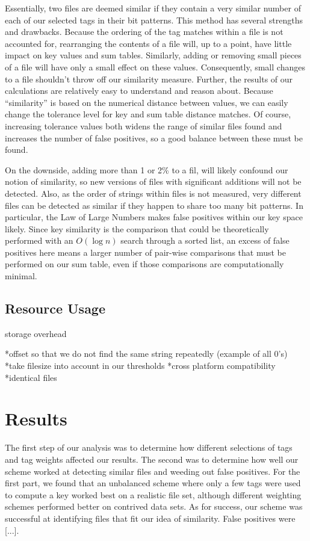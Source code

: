 \documentclass[10pt, twocolumn]{article}
\begin{document}
Essentially, two files are deemed similar if they contain a very similar number of each of our selected tags in their bit patterns.  This method has several strengths and drawbacks.  Because the ordering of the tag matches within a file is not accounted for, rearranging the contents of a file will, up to a point, have little impact on key values and sum tables.  Similarly, adding or removing small pieces of a file will have only a small effect on these values.  Consequently, small changes to a file shouldn't throw off our similarity measure.  Further, the results of our calculations are relatively easy to understand and reason about.  Because ``similarity'' is based on the numerical distance between values, we can easily change the tolerance level for key and sum table distance matches.  Of course, increasing tolerance values both widens the range of similar files found and increases the number of false positives, so a good balance between these must be found.

On the downside, adding more than 1 or 2\% to a fil, will likely confound our notion of similarity, so new versions of files with significant additions will not be detected.  Also, as the order of strings within files is not measured, very different files can be detected as similar if they happen to share too many bit patterns.  In particular, the Law of Large Numbers makes false positives within our key space likely.  Since key similarity is the comparison that could be theoretically performed with an $O(\log n)$ search through a sorted list, an excess of false positives here means a larger number of pair-wise comparisons that must be performed on our sum table, even if those comparisons are computationally minimal.

\subsection{Resource Usage}

storage overhead

*offset so that we do not find the same string repeatedly (example of all 0's) 
*take filesize into account in our thresholds 
*cross platform compatibility
*identical files




\section{Results}

The first step of our analysis was to determine how different selections of tags and tag weights affected our results.  The second was to determine how well our scheme worked at detecting similar files and weeding out false positives.  For the first part, we found that an unbalanced scheme where only a few tags were used to compute a key worked best on a realistic file set, although different weighting schemes performed better on contrived data sets.  As for success, our scheme was successful at identifying files that fit our idea of similarity.  False positives were [...].
\end{document}
